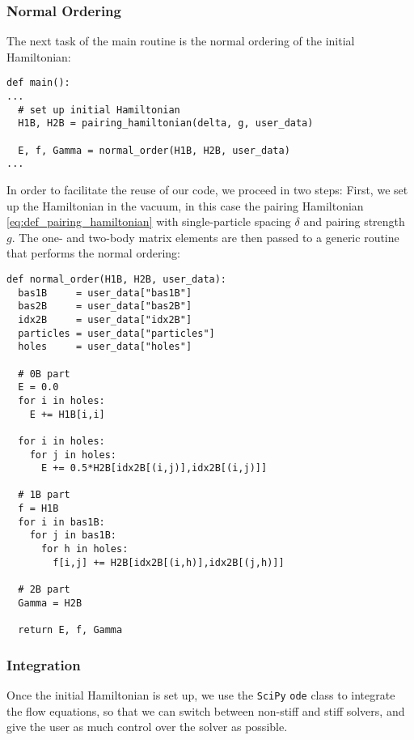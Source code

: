\subsubsection*{Normal Ordering}
The next task of the main routine is the normal ordering of the initial
Hamiltonian: 
\begin{lstlisting}
def main():
...
  # set up initial Hamiltonian
  H1B, H2B = pairing_hamiltonian(delta, g, user_data)

  E, f, Gamma = normal_order(H1B, H2B, user_data) 
...
\end{lstlisting}
In order to facilitate the reuse of our code, we proceed in two
steps: First, we set up the Hamiltonian in the vacuum, in this case the
pairing Hamiltonian \eqref{eq:def_pairing_hamiltonian} with single-particle
spacing $\delta$ and pairing strength $g$. The one- and two-body matrix
elements are then passed to a generic routine that performs the normal ordering:
\begin{lstlisting}
def normal_order(H1B, H2B, user_data):
  bas1B     = user_data["bas1B"]
  bas2B     = user_data["bas2B"]
  idx2B     = user_data["idx2B"]
  particles = user_data["particles"]
  holes     = user_data["holes"]

  # 0B part
  E = 0.0
  for i in holes:
    E += H1B[i,i]

  for i in holes:
    for j in holes:
      E += 0.5*H2B[idx2B[(i,j)],idx2B[(i,j)]]  

  # 1B part
  f = H1B
  for i in bas1B:
    for j in bas1B:
      for h in holes:
        f[i,j] += H2B[idx2B[(i,h)],idx2B[(j,h)]]  

  # 2B part
  Gamma = H2B

  return E, f, Gamma
\end{lstlisting}

\subsubsection*{Integration}
Once the initial Hamiltonian is set up, we use the \texttt{SciPy}
\texttt{ode} class to integrate the flow equations, so that we can
switch between non-stiff and stiff solvers, and give the user as 
much control over the solver as possible.

